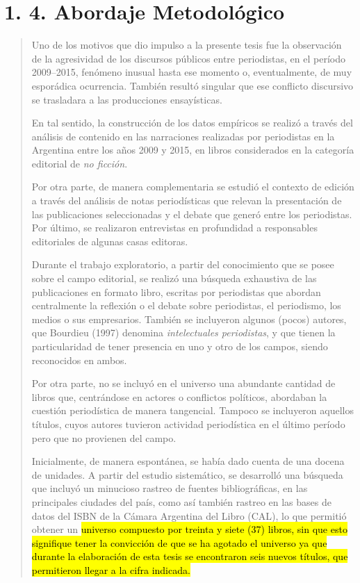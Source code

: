 \section{1. 4. Abordaje Metodológico}

\begin{quote}
Uno de los motivos que dio impulso a la presente tesis fue la observación de la agresividad de los discursos públicos entre periodistas, en el período 2009--2015, fenómeno inusual hasta ese momento o, eventualmente, de muy esporádica ocurrencia. También resultó singular que ese conflicto discursivo se trasladara a las producciones ensayísticas.

En tal sentido, la construcción de los datos empíricos se realizó a través del análisis de contenido en las narraciones realizadas por periodistas en la Argentina entre los años 2009 y 2015, en libros considerados en la categoría editorial de \emph{no ficción}.

Por otra parte, de manera complementaria se estudió el contexto de edición a través del análisis de notas periodísticas que relevan la presentación de las publicaciones seleccionadas y el debate que generó entre los periodistas. Por último, se realizaron entrevistas en profundidad a responsables editoriales de algunas casas editoras.

Durante el trabajo exploratorio, a partir del conocimiento que se posee sobre el campo editorial, se realizó una búsqueda exhaustiva de las publicaciones en formato libro, escritas por periodistas que abordan centralmente la reflexión o el debate sobre periodistas, el periodismo, los medios o sus empresarios. También se incluyeron algunos (pocos) autores, que Bourdieu (1997) denomina \emph{intelectuales periodistas}, y que tienen la particularidad de tener presencia en uno y otro de los campos, siendo reconocidos en ambos.

Por otra parte, no se incluyó en el universo una abundante cantidad de libros que, centrándose en actores o conflictos políticos, abordaban la cuestión periodística de manera tangencial. Tampoco se incluyeron aquellos títulos, cuyos autores tuvieron actividad periodística en el último período pero que no provienen del campo.

Inicialmente, de manera espontánea, se había dado cuenta de una docena de unidades. A partir del estudio sistemático, se desarrolló una búsqueda que incluyó un minucioso rastreo de fuentes bibliográficas, en las principales ciudades del país, como así también rastreo en las bases de datos del ISBN de la Cámara Argentina del Libro (CAL), lo que permitió obtener un \hl{universo compuesto por treinta y siete (37) libros, sin que esto signifique tener la convicción de que se ha agotado el universo ya que durante la elaboración de esta tesis se encontraron seis nuevos títulos, que permitieron llegar a la cifra indicada.}


\end{quote}
